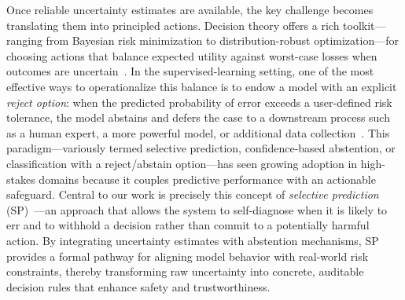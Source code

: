 Once reliable uncertainty estimates are available, the key challenge becomes translating them into principled actions. Decision theory offers a rich toolkit—ranging from Bayesian risk minimization to distribution-robust optimization—for choosing actions that balance expected utility against worst-case losses when outcomes are uncertain~\citep{berger2013statistical,rahimian2022frameworks}. In the supervised-learning setting, one of the most effective ways to operationalize this balance is to endow a model with an explicit \emph{reject option}: when the predicted probability of error exceeds a user-defined risk tolerance, the model abstains and defers the case to a downstream process such as a human expert, a more powerful model, or additional data collection~\citep{bartlett2008classification,geifman2017selective}. This paradigm—variously termed selective prediction, confidence-based abstention, or classification with a reject/abstain option—has seen growing adoption in high-stakes domains because it couples predictive performance with an actionable safeguard. Central to our work is precisely this concept of \textit{selective prediction} (SP)~\citep{chow1957optimum,el2010foundations}—an approach that allows the system to self-diagnose when it is likely to err and to withhold a decision rather than commit to a potentially harmful action. By integrating uncertainty estimates with abstention mechanisms, SP provides a formal pathway for aligning model behavior with real-world risk constraints, thereby transforming raw uncertainty into concrete, auditable decision rules that enhance safety and trustworthiness.



